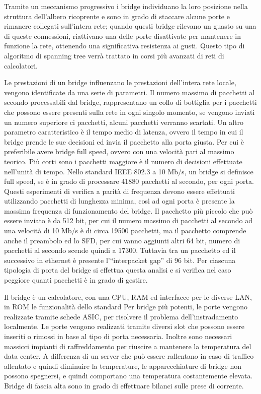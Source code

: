 \documentclass{article}
\numberwithin{equation}{subsection}
\begin{document}
Tramite un meccanismo progressivo i bridge individuano la loro posizione nella struttura dell'albero ricoprente e sono in grado di staccare alcune porte e rimanere 
collegati sull'intera rete; quando questi bridge rilevano un guasto su una di queste connessioni, riattivano una delle porte disattivate per mantenere in funzione la 
rete, ottenendo una significativa resistenza ai gusti. 
Questo tipo di algoritmo di spanning tree verrà trattato in corsi più avanzati di reti di calcolatori. 

Le prestazioni di un bridge influenzano le prestazioni dell'intera rete locale, vengono identificate da una serie di parametri. Il numero massimo di pacchetti al 
secondo processabili dal bridge, rappresentano un collo di bottiglia per i pacchetti che possono essere presenti sulla rete in ogni singolo momento, se vengono 
inviati un numero superiore ci pacchetti, alcuni pacchetti verranno scartati. Un altro parametro caratteristico è il tempo medio di latenza, ovvero il tempo in cui il 
bridge prende le sue decisioni ed invia il pacchetto alla porta giusta. 
Per cui è preferibile avere bridge full speed, ovvero con una velocità pari al massimo teorico. Più corti sono i pacchetti maggiore è il numero di decisioni 
effettuate nell'unità di tempo. Nello standard IEEE 802.3 a 10 Mb/s, un bridge si definisce full speed, se è in grado di processare 41880 pacchetti al secondo, 
per ogni porta. Questi esperimenti di verifica a parità di frequenza devono essere effettuati utilizzando pacchetti di lunghezza minima, così ad ogni porta è presente 
la massima frequenza di funzionamento del bridge. 
Il pacchetto più piccolo che può essere inviato è da 512 bit, per cui il numero massimo di pacchetti al secondo ad una 
velocità di 10 Mb/s è di circa 19500 pacchetti, ma il pacchetto comprende anche il preambolo ed lo SFD, per cui vanno aggiunti altri 64 bit, 
numero di pacchetti al secondo scende quindi a 17300. 
Tuttavia tra un pacchetto ed il successivo in ethernet è presente l'``interpacket gap'' di 96 bit. 
Per ciascuna tipologia di porta del bridge si effettua questa analisi e si verifica nel caso peggiore quanti pacchetti è in grado di gestire. 


Il bridge è un calcolatore, con una CPU, RAM ed interfacce per le diverse LAN, in ROM le funzionalità dello standard %
Per bridge più potenti, le  porte vengono realizzate tramite schede ASIC, per risolvere il problema dell'instradamento localmente. Le porte vengono realizzati tramite 
diversi slot che possono essere inseriti o rimossi in base al tipo di porta necessaria. Inoltre sono necessari massicci impianti di raffreddamento per riuscire a 
mantenere la temperatura del data center. A differenza di un server che può essere rallentano in caso di traffico allentato e quindi diminuire la temperature, le apparecchiature di bridge non possono 
spegnersi, e quindi comportano una temperatura costantemente elevata. Bridge di fascia alta sono in grado di effettuare bilanci sulle prese di corrente. 
\end{document}
